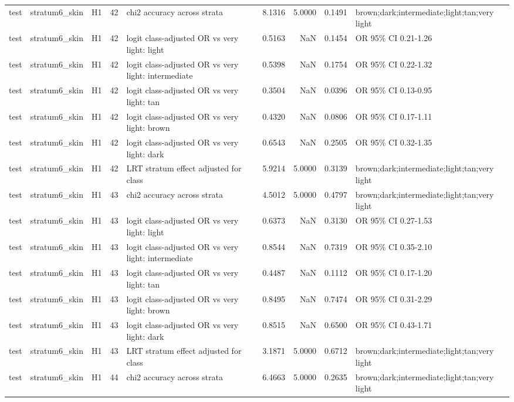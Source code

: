 \begin{tabular}{lllrlrrrl}
test & stratum6\_skin & H1 & 42 & chi2 accuracy across strata & 8.1316 & 5.0000 & 0.1491 & brown;dark;intermediate;light;tan;very light \\
test & stratum6\_skin & H1 & 42 & logit class-adjusted OR vs very light: light & 0.5163 & NaN & 0.1454 & OR 95\% CI 0.21-1.26 \\
test & stratum6\_skin & H1 & 42 & logit class-adjusted OR vs very light: intermediate & 0.5398 & NaN & 0.1754 & OR 95\% CI 0.22-1.32 \\
test & stratum6\_skin & H1 & 42 & logit class-adjusted OR vs very light: tan & 0.3504 & NaN & 0.0396 & OR 95\% CI 0.13-0.95 \\
test & stratum6\_skin & H1 & 42 & logit class-adjusted OR vs very light: brown & 0.4320 & NaN & 0.0806 & OR 95\% CI 0.17-1.11 \\
test & stratum6\_skin & H1 & 42 & logit class-adjusted OR vs very light: dark & 0.6543 & NaN & 0.2505 & OR 95\% CI 0.32-1.35 \\
test & stratum6\_skin & H1 & 42 & LRT stratum effect adjusted for class & 5.9214 & 5.0000 & 0.3139 & brown;dark;intermediate;light;tan;very light \\
test & stratum6\_skin & H1 & 43 & chi2 accuracy across strata & 4.5012 & 5.0000 & 0.4797 & brown;dark;intermediate;light;tan;very light \\
test & stratum6\_skin & H1 & 43 & logit class-adjusted OR vs very light: light & 0.6373 & NaN & 0.3130 & OR 95\% CI 0.27-1.53 \\
test & stratum6\_skin & H1 & 43 & logit class-adjusted OR vs very light: intermediate & 0.8544 & NaN & 0.7319 & OR 95\% CI 0.35-2.10 \\
test & stratum6\_skin & H1 & 43 & logit class-adjusted OR vs very light: tan & 0.4487 & NaN & 0.1112 & OR 95\% CI 0.17-1.20 \\
test & stratum6\_skin & H1 & 43 & logit class-adjusted OR vs very light: brown & 0.8495 & NaN & 0.7474 & OR 95\% CI 0.31-2.29 \\
test & stratum6\_skin & H1 & 43 & logit class-adjusted OR vs very light: dark & 0.8515 & NaN & 0.6500 & OR 95\% CI 0.43-1.71 \\
test & stratum6\_skin & H1 & 43 & LRT stratum effect adjusted for class & 3.1871 & 5.0000 & 0.6712 & brown;dark;intermediate;light;tan;very light \\
test & stratum6\_skin & H1 & 44 & chi2 accuracy across strata & 6.4663 & 5.0000 & 0.2635 & brown;dark;intermediate;light;tan;very light \\

\end{tabular}
